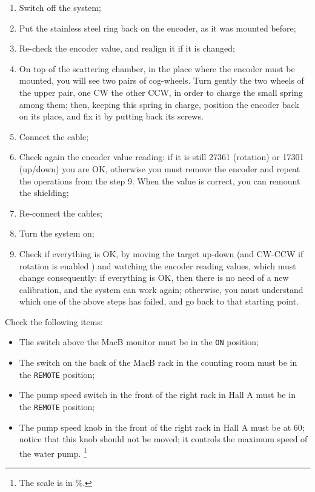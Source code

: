 \begin{enumerate}
	\footnote{One single encoder step error means an offset error  of 
	about 0.04 degrees, or 0.006 mm.}. If values do not match, then turn 
	MANUALLY the encoder axis, until the display value is at the desired 
	one. When done, you can remount the encoder on top of the scattering 
	chamber.
\item Switch off the system;
\item Put the stainless steel ring back on the encoder, as it was mounted 
	before;
\item Re-check the encoder value, and realign it if it is changed; 
\item On top of the scattering chamber, in the place where the encoder must 
	be mounted, you will see two pairs of cog-wheels. Turn gently the two
	wheels of the upper pair, one CW the other CCW, in order to 
	charge the small spring among them; then, keeping this spring in 
	charge, position the encoder back on its place, and fix it by putting 
	back its screws.
\item Connect the cable;
\item Check again the encoder value reading: if it is still 27361 (rotation) or
 	17301 (up/down) you  are OK, otherwise you must remove 
	the encoder and repeat the operations from  the step 9. 
	When the value is correct, you can remount the shielding; 
\item Re-connect the cables;
\item Turn the system on;
\item Check if everything is OK, by moving the target up-down (and CW-CCW if 
	rotation is enabled )
	and watching the encoder reading values, which must change 
	consequently: if everything is OK, then there is no need of a new 
	calibration, and the system can work again;  otherwise, you must 
	understand which one of the above steps has failed, and go back to 
	that starting point. 
\end{enumerate}


Check the following items:
\begin{itemize}
 \item The switch above the MacB monitor must be in the \verb.ON. position; 
 \item The switch on the back of the MacB rack in the counting room must be in 
	the \verb.REMOTE. position;
 \item The pump speed switch in the front of the right rack in
 	Hall A must be in the \verb.REMOTE. position;
 \item The pump speed knob in the front of the right rack in Hall
 	A must be at 60; notice that this knob should not be
 	moved; it controls the maximum speed of the water pump.
	 \footnote{The scale is in \%.} 
\end{itemize}
%
